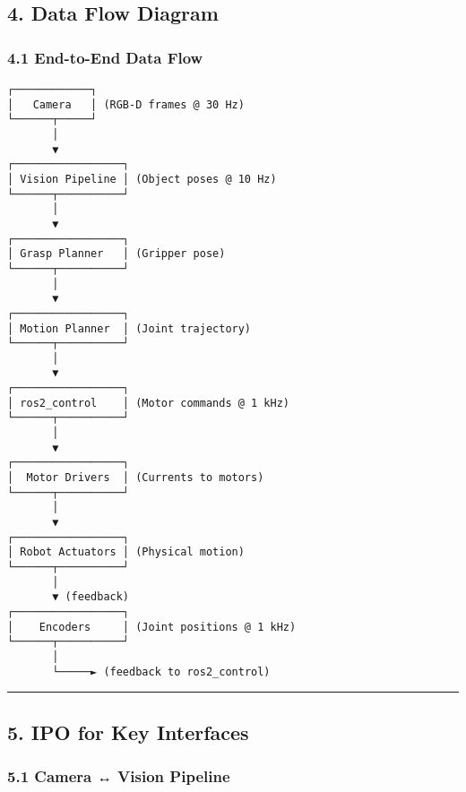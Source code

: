 \documentclass[
]{article}
\begin{document}
\hypertarget{data-flow-diagram}{%
\subsection{4. Data Flow Diagram}\label{data-flow-diagram}}

\hypertarget{end-to-end-data-flow}{%
\subsubsection{4.1 End-to-End Data Flow}\label{end-to-end-data-flow}}

\begin{verbatim}
┌────────────┐
│   Camera   │ (RGB-D frames @ 30 Hz)
└──────┬─────┘
       │
       ▼
┌─────────────────┐
│ Vision Pipeline │ (Object poses @ 10 Hz)
└──────┬──────────┘
       │
       ▼
┌─────────────────┐
│ Grasp Planner   │ (Gripper pose)
└──────┬──────────┘
       │
       ▼
┌─────────────────┐
│ Motion Planner  │ (Joint trajectory)
└──────┬──────────┘
       │
       ▼
┌─────────────────┐
│ ros2_control    │ (Motor commands @ 1 kHz)
└──────┬──────────┘
       │
       ▼
┌─────────────────┐
│  Motor Drivers  │ (Currents to motors)
└──────┬──────────┘
       │
       ▼
┌─────────────────┐
│ Robot Actuators │ (Physical motion)
└──────┬──────────┘
       │
       ▼ (feedback)
┌─────────────────┐
│    Encoders     │ (Joint positions @ 1 kHz)
└──────┬──────────┘
       │
       └─────► (feedback to ros2_control)
\end{verbatim}

\begin{center}\rule{0.5\linewidth}{0.5pt}\end{center}

\hypertarget{ipo-for-key-interfaces}{%
\subsection{5. IPO for Key Interfaces}\label{ipo-for-key-interfaces}}

\hypertarget{camera-vision-pipeline}{%
\subsubsection{5.1 Camera ↔ Vision
Pipeline}\label{camera-vision-pipeline}}
\end{document}
